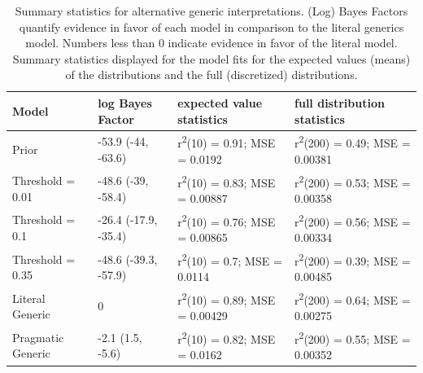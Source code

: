 \documentclass[floatsintext,doc]{apa6}
\newcommand{\mht}[1]{{\textcolor{Blue}{[mht: #1]}}}
\newcommand{\ndg}[1]{{\textcolor{Green}{[ndg: #1]}}}
\begin{document}
\begin{table}[h]
\centering
\begingroup\fontsize{9pt}{10pt}\selectfont
\begin{tabular}{llll}
  \hline
Model & log Bayes Factor & expected value statistics & full distribution statistics \\ 
  \hline
Prior & -53.9 (-44, -63.6) & r\textsuperscript{2}(10) = 0.91; MSE = 0.0192 & r\textsuperscript{2}(200) = 0.49; MSE = 0.00381 \\ 
  Threshold = 0.01 & -48.6 (-39, -58.4) & r\textsuperscript{2}(10) = 0.83; MSE = 0.00887 & r\textsuperscript{2}(200) = 0.53; MSE = 0.00358 \\ 
  Threshold = 0.1 & -26.4 (-17.9, -35.4) & r\textsuperscript{2}(10) = 0.76; MSE = 0.00865 & r\textsuperscript{2}(200) = 0.56; MSE = 0.00334 \\ 
  Threshold = 0.35 & -48.6 (-39.3, -57.9) & r\textsuperscript{2}(10) = 0.7; MSE = 0.0114 & r\textsuperscript{2}(200) = 0.39; MSE = 0.00485 \\ 
  Literal Generic & 0 & r\textsuperscript{2}(10) = 0.89; MSE = 0.00429 & r\textsuperscript{2}(200) = 0.64; MSE = 0.00275 \\ 
  Pragmatic Generic & -2.1 (1.5, -5.6) & r\textsuperscript{2}(10) = 0.82; MSE = 0.0162 & r\textsuperscript{2}(200) = 0.55; MSE = 0.00352 \\ 
   \hline
\end{tabular}
\endgroup
\caption{Summary statistics for alternative generic interpretations. (Log) Bayes Factors quantify evidence in favor of each model in comparison to the literal generics model. Numbers less than 0 indicate evidence in favor of the literal model. Summary statistics displayed for the model fits for the expected values (means) of the distributions and the full (discretized) distributions. 
} 
\end{table}
\end{document}
